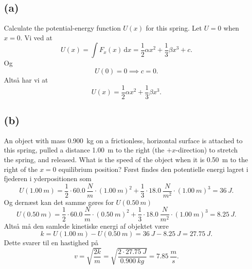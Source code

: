 \documentclass[12pt]{article}
\begin{document}
\subsection*{(a)}
Calculate the potential-energy function $U(x)$ for this spring. Let $U = 0$ when $x = 0$.
\bigbreak
Vi ved at
\[
U(x) = \int F_x (x) \, \mathrm{d}x = \frac{1}{2}\alpha x^2 +\frac{1}{3}\beta x^3 + c
.\] 
Og
\[
U(0) = 0 \implies c=0
.\]
Altså har vi at
\[
U(x) = \frac{1}{2}\alpha x^2 + \frac{1}{3} \beta x^3
.\] 


\subsection*{(b)}
An object with mass \qty{0,900}{kg} on a frictionless, horizontal surface is attached to this spring, pulled a distance \qty{1,00}{m} to the right (the $+x$-direction) to stretch the spring, and released. What is the speed of the object when it is \qty{0,50}{m} to the right of the $x = 0$ equilibrium position?
\bigbreak
Først findes den potentielle energi lagret i fjederen i yderpositionen som
\[
U(\qty{1,00}{m}) = \frac{1}{2}\cdot \qty{60,0}{\frac{N}{m}}\cdot (\qty{1,00}{m})^2 + \frac{1}{3}\cdot \qty{18,0}{\frac{N}{m^2}}\cdot (\qty{1,00}{m})^3 = \qty{36}{J}
.\]
Og dernæst kan det samme gøres for $U(\qty{0,50}{m})$
\[
U(\qty{0,50}{m}) = \frac{1}{2}\cdot \qty{60,0}{\frac{N}{m}}\cdot (\qty{0,50}{m})^2 + \frac{1}{3}\cdot \qty{18,0}{\frac{N}{m^2}}\cdot (\qty{1,00}{m})^3 = \qty{8,25}{J}
.\] 
Altså må den samlede kinetiske energi af objektet være
\[
k = U(\qty{1,00}{m}) - U(\qty{0,50}{m}) = \qty{36}{J} - \qty{8,25}{J} = \qty{27,75}{J}
.\] 
Dette svarer til en hastighed på
\[
v = \sqrt{\frac{2k}{m}} = \sqrt{\frac{2\cdot \qty{27,75}{J}}{\qty{0,900}{kg}}} = \qty{7,85}{\frac{m}{s}}
.\] 
\end{document}
